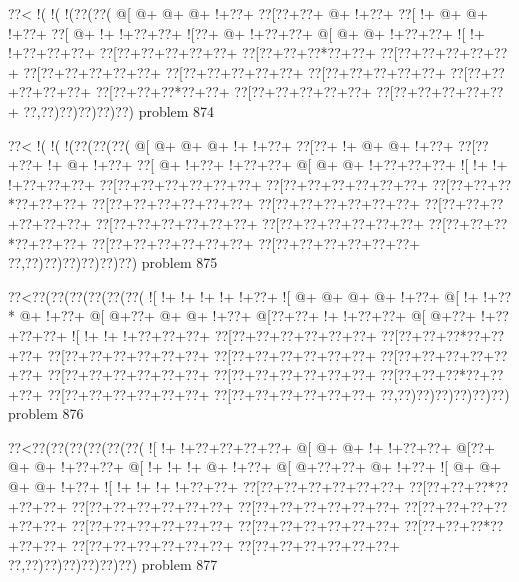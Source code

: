 \vbox{\vbox{\goo
\0??<\- !(\- !(\- !(\0??(\0??(
\- @[\- @+\- @+\- @+\- !+\0??+
\0??[\0??+\0??+\- @+\- !+\0??+
\0??[\- !+\- @+\- @+\- !+\0??+
\0??[\- @+\- !+\- !+\0??+\0??+
\- ![\0??+\- @+\- !+\0??+\0??+
\- @[\- @+\- @+\- !+\0??+\0??+
\- ![\- !+\- !+\0??+\0??+\0??+
\0??[\0??+\0??+\0??+\0??+\0??+
\0??[\0??+\0??+\0??*\0??+\0??+
\0??[\0??+\0??+\0??+\0??+\0??+
\0??[\0??+\0??+\0??+\0??+\0??+
\0??[\0??+\0??+\0??+\0??+\0??+
\0??[\0??+\0??+\0??+\0??+\0??+
\0??[\0??+\0??+\0??+\0??+\0??+
\0??[\0??+\0??+\0??*\0??+\0??+
\0??[\0??+\0??+\0??+\0??+\0??+
\0??[\0??+\0??+\0??+\0??+\0??+
\0??,\0??)\0??)\0??)\0??)\0??)
}
\hfil problem 874\hfil\break
}

\vbox{\vbox{\goo
\0??<\- !(\- !(\- !(\0??(\0??(\0??(
\- @[\- @+\- @+\- @+\- !+\- !+\0??+
\0??[\0??+\- !+\- @+\- @+\- !+\0??+
\0??[\0??+\0??+\- !+\- @+\- !+\0??+
\0??[\- @+\- !+\0??+\- !+\0??+\0??+
\- @[\- @+\- @+\- !+\0??+\0??+\0??+
\- ![\- !+\- !+\- !+\0??+\0??+\0??+
\0??[\0??+\0??+\0??+\0??+\0??+\0??+
\0??[\0??+\0??+\0??+\0??+\0??+\0??+
\0??[\0??+\0??+\0??*\0??+\0??+\0??+
\0??[\0??+\0??+\0??+\0??+\0??+\0??+
\0??[\0??+\0??+\0??+\0??+\0??+\0??+
\0??[\0??+\0??+\0??+\0??+\0??+\0??+
\0??[\0??+\0??+\0??+\0??+\0??+\0??+
\0??[\0??+\0??+\0??+\0??+\0??+\0??+
\0??[\0??+\0??+\0??*\0??+\0??+\0??+
\0??[\0??+\0??+\0??+\0??+\0??+\0??+
\0??[\0??+\0??+\0??+\0??+\0??+\0??+
\0??,\0??)\0??)\0??)\0??)\0??)\0??)
}
\hfil problem 875\hfil\break
}

\vbox{\vbox{\goo
\0??<\0??(\0??(\0??(\0??(\0??(\0??(
\- ![\- !+\- !+\- !+\- !+\- !+\0??+
\- ![\- @+\- @+\- @+\- @+\- !+\0??+
\- @[\- !+\- !+\0??*\- @+\- !+\0??+
\- @[\- @+\0??+\- @+\- @+\- !+\0??+
\- @[\0??+\0??+\- !+\- !+\0??+\0??+
\- @[\- @+\0??+\- !+\0??+\0??+\0??+
\- ![\- !+\- !+\- !+\0??+\0??+\0??+
\0??[\0??+\0??+\0??+\0??+\0??+\0??+
\0??[\0??+\0??+\0??*\0??+\0??+\0??+
\0??[\0??+\0??+\0??+\0??+\0??+\0??+
\0??[\0??+\0??+\0??+\0??+\0??+\0??+
\0??[\0??+\0??+\0??+\0??+\0??+\0??+
\0??[\0??+\0??+\0??+\0??+\0??+\0??+
\0??[\0??+\0??+\0??+\0??+\0??+\0??+
\0??[\0??+\0??+\0??*\0??+\0??+\0??+
\0??[\0??+\0??+\0??+\0??+\0??+\0??+
\0??[\0??+\0??+\0??+\0??+\0??+\0??+
\0??,\0??)\0??)\0??)\0??)\0??)\0??)
}
\hfil problem 876\hfil\break
}

\vbox{\vbox{\goo
\0??<\0??(\0??(\0??(\0??(\0??(\0??(
\- ![\- !+\- !+\0??+\0??+\0??+\0??+
\- @[\- @+\- @+\- !+\- !+\0??+\0??+
\- @[\0??+\- @+\- @+\- !+\0??+\0??+
\- @[\- !+\- !+\- !+\- @+\- !+\0??+
\- @[\- @+\0??+\0??+\- @+\- !+\0??+
\- ![\- @+\- @+\- @+\- @+\- !+\0??+
\- ![\- !+\- !+\- !+\- !+\0??+\0??+
\0??[\0??+\0??+\0??+\0??+\0??+\0??+
\0??[\0??+\0??+\0??*\0??+\0??+\0??+
\0??[\0??+\0??+\0??+\0??+\0??+\0??+
\0??[\0??+\0??+\0??+\0??+\0??+\0??+
\0??[\0??+\0??+\0??+\0??+\0??+\0??+
\0??[\0??+\0??+\0??+\0??+\0??+\0??+
\0??[\0??+\0??+\0??+\0??+\0??+\0??+
\0??[\0??+\0??+\0??*\0??+\0??+\0??+
\0??[\0??+\0??+\0??+\0??+\0??+\0??+
\0??[\0??+\0??+\0??+\0??+\0??+\0??+
\0??,\0??)\0??)\0??)\0??)\0??)\0??)
}
\hfil problem 877\hfil\break
}

